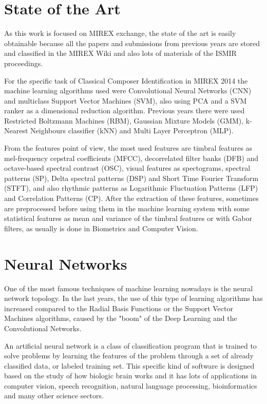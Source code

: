 \documentclass[a4paper,openany,oneside,12pt]{book}
\begin{document}
\section{State of the Art}
As this work is focused on MIREX exchange, the state of the art is easily obtainable because all the papers and submissions from previous years are stored and classified in the MIREX Wiki and also lots of materials of the ISMIR proceedings.

For the specific task of Classical Composer Identification in MIREX 2014 the machine learning algorithms used were Convolutional Neural Networks (CNN) and multiclass Support Vector Machines (SVM), also using PCA and a SVM ranker as a dimensional reduction algorithm. Previous years there were used Restricted Boltzmann Machines (RBM), Gaussian Mixture Models (GMM), k-Nearest Neighbours classifier (kNN) and Multi Layer Perceptron (MLP).

From the features point of view, the most used features are timbral features as mel-frequency cepstral coefficients (MFCC), decorrelated filter banks (DFB) and octave-based spectral contrast (OSC), visual features as spectograms, spectral patterns (SP), Delta spectral patterns (DSP) and Short Time Fourier Transform (STFT), and also rhythmic patterns as Logarithmic Fluctuation Patterns (LFP) and Correlation Patterns (CP). After the extraction of these features, sometimes are preprocessed before using them in the machine learning system with some statistical features as mean and variance of the timbral features or with Gabor filters, as usually is done in Biometrics and Computer Vision.



\section{Neural Networks}

One of the most famous techniques of machine learning nowadays is the neural network topology. In the last years, the use of this type of learning algorithms has increased compared to the Radial Basis Functions or the Support Vector Machines algorithms, caused by the "boom" of the Deep Learning and the Convolutional Networks.

An artificial neural network is a class of classification program that is trained to solve problems by learning the features of the problem through a set of already classified data, or labeled training set. This specific kind of software is designed based on the study of how  biologic brain works and it has lots of applications in computer vision, speech recognition, natural language processing, bioinformatics and many other science sectors.
\end{document}

